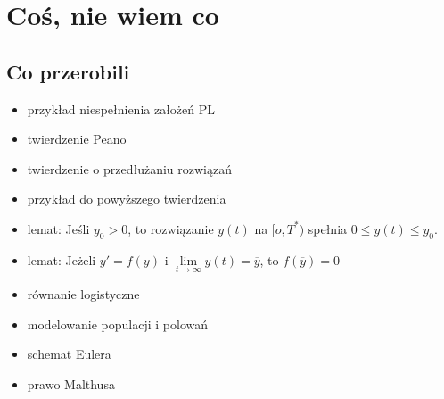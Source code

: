 \section{Coś, nie wiem co}

\subsection{Co przerobili}

\begin{itemize}
    \item przykład niespełnienia założeń PL
    \item twierdzenie Peano
    \item twierdzenie o przedłużaniu rozwiązań
    \item przykład do powyższego twierdzenia
    \item lemat: Jeśli $y_0>0$, to rozwiązanie $y(t)$ na $[o, T^*)$ spełnia $0\leq
    y(t)\leq y_0$.
    \item lemat: Jeżeli $y'=f(y)$ i $\lim\limits_{t\to\infty}y(t)=\overline y$, to
    $f(\overline y)=0$
    \item równanie logistyczne
    \item modelowanie populacji i polowań
    \item schemat Eulera
    \item prawo Malthusa
\end{itemize}
